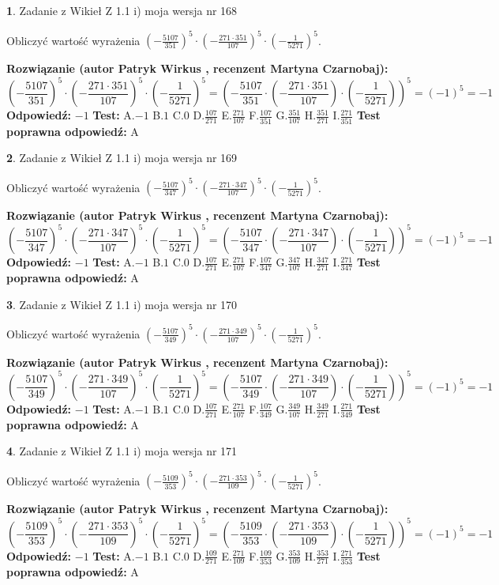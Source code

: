 \documentclass[12pt, a4paper]{article}
\theoremstyle{definition} %
\newtheorem{zad}{}
\newcommand{\zadStart}[1]{\begin{zad}#1\newline}
\newcommand{\zadStop}{\end{zad}}
\newcommand{\rozwStart}[2]{\noindent \textbf{Rozwiązanie (autor #1 , recenzent #2): }\newline}
\newcommand{\rozwStop}{\newline}
\newcommand{\odpStart}{\noindent \textbf{Odpowiedź:}\newline}
\newcommand{\odpStop}{\newline}
\newcommand{\testStart}{\noindent \textbf{Test:}\newline}
\newcommand{\testStop}{\newline}
\newcommand{\kluczStart}{\noindent \textbf{Test poprawna odpowiedź:}\newline}
\newcommand{\kluczStop}{\newline}
\begin{document}
\zadStart{Zadanie z Wikieł Z 1.1 i) moja wersja nr 168}

Obliczyć wartość wyrażenia $(-\frac{5107}{351})^{5} \cdot (-\frac{271 \cdot 351}{107})^{5} \cdot (-\frac{1}{5271})^{5}$.
\zadStop
\rozwStart{Patryk Wirkus}{Martyna Czarnobaj}
$$(-\frac{5107}{351})^{5} \cdot (-\frac{271 \cdot 351}{107})^{5} \cdot (-\frac{1}{5271})^{5} = (-\frac{5107}{351} \cdot (-\frac{271 \cdot 351}{107}) \cdot (-\frac{1}{5271}))^{5} = (-1)^{5} = -1$$
\rozwStop
\odpStart
$-1$
\odpStop
\testStart
A.$-1$ B.$1$ C.$0$ D.$\frac{107}{271}$ E.$\frac{271}{107}$
F.$\frac{107}{351}$ G.$\frac{351}{107}$
H.$\frac{351}{271}$
I.$\frac{271}{351}$
\testStop
\kluczStart
A
\kluczStop



\zadStart{Zadanie z Wikieł Z 1.1 i) moja wersja nr 169}

Obliczyć wartość wyrażenia $(-\frac{5107}{347})^{5} \cdot (-\frac{271 \cdot 347}{107})^{5} \cdot (-\frac{1}{5271})^{5}$.
\zadStop
\rozwStart{Patryk Wirkus}{Martyna Czarnobaj}
$$(-\frac{5107}{347})^{5} \cdot (-\frac{271 \cdot 347}{107})^{5} \cdot (-\frac{1}{5271})^{5} = (-\frac{5107}{347} \cdot (-\frac{271 \cdot 347}{107}) \cdot (-\frac{1}{5271}))^{5} = (-1)^{5} = -1$$
\rozwStop
\odpStart
$-1$
\odpStop
\testStart
A.$-1$ B.$1$ C.$0$ D.$\frac{107}{271}$ E.$\frac{271}{107}$
F.$\frac{107}{347}$ G.$\frac{347}{107}$
H.$\frac{347}{271}$
I.$\frac{271}{347}$
\testStop
\kluczStart
A
\kluczStop



\zadStart{Zadanie z Wikieł Z 1.1 i) moja wersja nr 170}

Obliczyć wartość wyrażenia $(-\frac{5107}{349})^{5} \cdot (-\frac{271 \cdot 349}{107})^{5} \cdot (-\frac{1}{5271})^{5}$.
\zadStop
\rozwStart{Patryk Wirkus}{Martyna Czarnobaj}
$$(-\frac{5107}{349})^{5} \cdot (-\frac{271 \cdot 349}{107})^{5} \cdot (-\frac{1}{5271})^{5} = (-\frac{5107}{349} \cdot (-\frac{271 \cdot 349}{107}) \cdot (-\frac{1}{5271}))^{5} = (-1)^{5} = -1$$
\rozwStop
\odpStart
$-1$
\odpStop
\testStart
A.$-1$ B.$1$ C.$0$ D.$\frac{107}{271}$ E.$\frac{271}{107}$
F.$\frac{107}{349}$ G.$\frac{349}{107}$
H.$\frac{349}{271}$
I.$\frac{271}{349}$
\testStop
\kluczStart
A
\kluczStop



\zadStart{Zadanie z Wikieł Z 1.1 i) moja wersja nr 171}

Obliczyć wartość wyrażenia $(-\frac{5109}{353})^{5} \cdot (-\frac{271 \cdot 353}{109})^{5} \cdot (-\frac{1}{5271})^{5}$.
\zadStop
\rozwStart{Patryk Wirkus}{Martyna Czarnobaj}
$$(-\frac{5109}{353})^{5} \cdot (-\frac{271 \cdot 353}{109})^{5} \cdot (-\frac{1}{5271})^{5} = (-\frac{5109}{353} \cdot (-\frac{271 \cdot 353}{109}) \cdot (-\frac{1}{5271}))^{5} = (-1)^{5} = -1$$
\rozwStop
\odpStart
$-1$
\odpStop
\testStart
A.$-1$ B.$1$ C.$0$ D.$\frac{109}{271}$ E.$\frac{271}{109}$
F.$\frac{109}{353}$ G.$\frac{353}{109}$
H.$\frac{353}{271}$
I.$\frac{271}{353}$
\testStop
\kluczStart
A
\kluczStop
\end{document}
